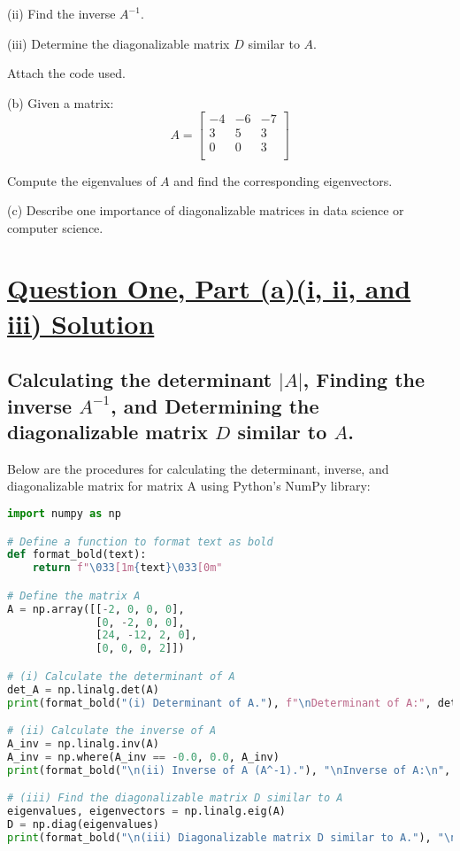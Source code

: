 \documentclass{article}
\begin{document}
(ii) Find the inverse $A^{-1}$.

(iii) Determine the diagonalizable matrix $D$ similar to $A$.

Attach the code used.

(b) Given a matrix:
    \[
    A =
    \begin{bmatrix}
    -4 & -6 & -7 \\
    3 & 5 & 3 \\
    0 & 0 & 3 \\
    \end{bmatrix}
    \]
    
Compute the eigenvalues of $A$ and find the corresponding eigenvectors.

(c) Describe one importance of diagonalizable matrices in data science or computer science.

\section*{\uline{\large Question One, Part (a)(i, ii, and iii) Solution}}

\subsection*{Calculating the determinant $|A|$, Finding the inverse $A^{-1}$, and Determining the diagonalizable matrix $D$ similar to $A$.}
 Below are the procedures for calculating the determinant, inverse, and diagonalizable matrix for matrix A using Python's NumPy library:

\begin{lstlisting}[language=Python, caption={Python Code}]
import numpy as np

# Define a function to format text as bold
def format_bold(text):
    return f"\033[1m{text}\033[0m"

# Define the matrix A
A = np.array([[-2, 0, 0, 0],
              [0, -2, 0, 0],
              [24, -12, 2, 0],
              [0, 0, 0, 2]])

# (i) Calculate the determinant of A
det_A = np.linalg.det(A)
print(format_bold("(i) Determinant of A."), f"\nDeterminant of A:", det_A)

# (ii) Calculate the inverse of A
A_inv = np.linalg.inv(A)
A_inv = np.where(A_inv == -0.0, 0.0, A_inv)
print(format_bold("\n(ii) Inverse of A (A^-1)."), "\nInverse of A:\n", A_inv)

# (iii) Find the diagonalizable matrix D similar to A
eigenvalues, eigenvectors = np.linalg.eig(A)
D = np.diag(eigenvalues)
print(format_bold("\n(iii) Diagonalizable matrix D similar to A."), "\nDiagonalizable matrix D:\n", D)
\end{lstlisting}
\end{document}
